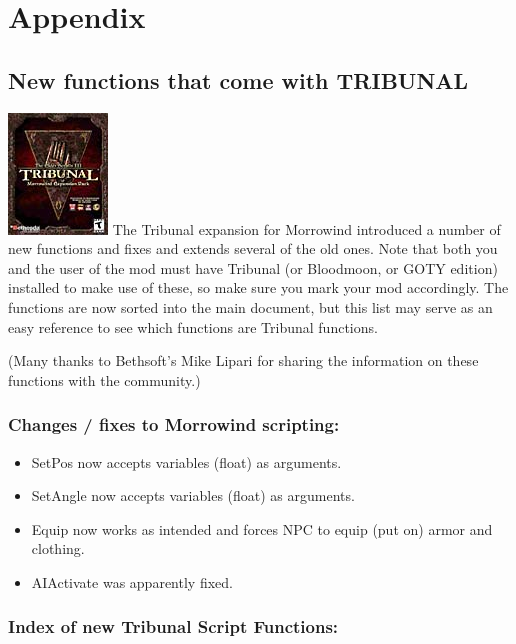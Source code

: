 \hypertarget{appendix}{%
\section{Appendix}\label{appendix}}

\hypertarget{new-functions-that-come-with-tribunal}{%
\subsection{New functions that come with
TRIBUNAL}\label{new-functions-that-come-with-tribunal}}

\includegraphics{media/image6.png} The Tribunal expansion for Morrowind
introduced a number of new functions and fixes and extends several of
the old ones. Note that both you and the user of the mod must have
Tribunal (or Bloodmoon, or GOTY edition) installed to make use of these,
so make sure you mark your mod accordingly. The functions are now sorted
into the main document, but this list may serve as an easy reference to
see which functions are Tribunal functions.

(Many thanks to Bethsoft's Mike Lipari for sharing the information on
these functions with the community.)

\hypertarget{changes-fixes-to-morrowind-scripting}{%
\subsubsection{Changes / fixes to Morrowind
scripting:}\label{changes-fixes-to-morrowind-scripting}}

\begin{itemize}
\item
  SetPos now accepts variables (float) as arguments.
\item
  SetAngle now accepts variables (float) as arguments.
\item
  Equip now works as intended and forces NPC to equip (put on) armor and
  clothing.
\item
  AIActivate was apparently fixed.
\end{itemize}

\hypertarget{index-of-new-tribunal-script-functions}{%
\subsubsection{Index of new Tribunal Script
Functions:}\label{index-of-new-tribunal-script-functions}}

